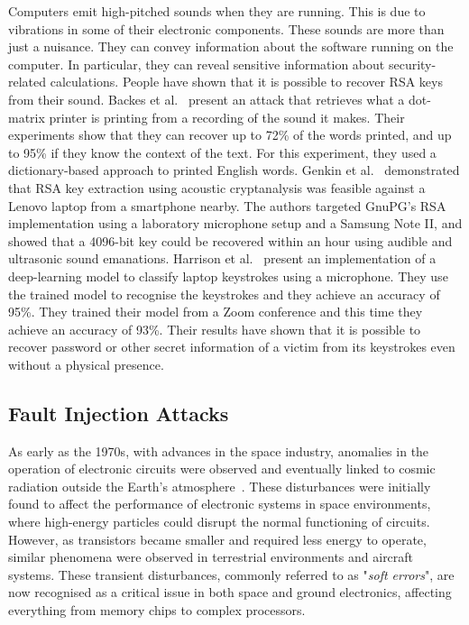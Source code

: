 Computers emit high-pitched sounds when they are running. This is due to vibrations in some of their electronic components. These sounds are more than just a nuisance. They can convey information about the software running on the computer. In particular, they can reveal sensitive information about security-related calculations. People have shown that it is possible to recover RSA keys from their sound.
Backes et al.~\cite{BDGPS-10-usenix} present an attack that retrieves what a dot-matrix printer is printing from a recording of the sound it makes. Their experiments show that they can recover up to 72\% of the words printed, and up to 95\% if they know the context of the text. For this experiment, they used a dictionary-based approach to printed English words.
Genkin et al.~\cite{GST-17-crypto} demonstrated that RSA key extraction using acoustic cryptanalysis was feasible against a Lenovo laptop from a smartphone nearby. The authors targeted GnuPG's RSA implementation using a laboratory microphone setup and a Samsung Note II, and showed that a 4096-bit key could be recovered within an hour using audible and ultrasonic sound emanations. Harrison et al.~\cite{HTM-23-eurospw} present an implementation of a deep-learning model to classify laptop keystrokes using a microphone. They use the trained model to recognise the keystrokes and they achieve an accuracy of 95\%. They trained their model from a Zoom conference and this time they achieve an accuracy of 93\%. Their results have shown that it is possible to recover password or other secret information of a victim from its keystrokes even without a physical presence.

\subsection{Fault Injection Attacks}
As early as the 1970s, with advances in the space industry, anomalies in the operation of electronic circuits were observed and eventually linked to cosmic radiation outside the Earth's atmosphere~\cite{BSH-75-tns,Z-96-ibm,ZL-79-science}. These disturbances were initially found to affect the performance of electronic systems in space environments, where high-energy particles could disrupt the normal functioning of circuits. However, as transistors became smaller and required less energy to operate, similar phenomena were observed in terrestrial environments and aircraft systems. These transient disturbances, commonly referred to as "\textit{soft errors}", are now recognised as a critical issue in both space and ground electronics, affecting everything from memory chips to complex processors.

